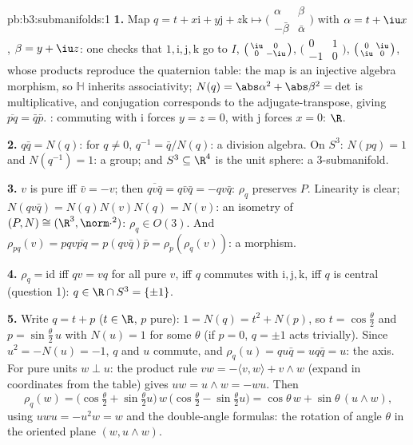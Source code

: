 \begin{solution}{pb:b3:submanifolds:1}
\textbf{1.} Map $q = t + x\mathrm i + y\mathrm j + z\mathrm k
\mapsto \bigl(\begin{smallmatrix}\alpha & \beta\\ -\bar\beta
& \bar\alpha\end{smallmatrix}\bigr)$ with $\alpha = t + \iu
x$, $\beta = y + \iu z$: one checks that $1, \mathrm i,
\mathrm j, \mathrm k$ go to $I$, $\bigl(\begin{smallmatrix}
\iu & 0\\ 0 & -\iu\end{smallmatrix}\bigr)$,
$\bigl(\begin{smallmatrix}0 & 1\\ -1 &
0\end{smallmatrix}\bigr)$, $\bigl(\begin{smallmatrix}0 &
\iu\\ \iu & 0\end{smallmatrix}\bigr)$, whose products
reproduce the quaternion table: the map is an injective
algebra morphism, so $\mathbb H$ inherits associativity;
$N(q) = \abs\alpha^2 + \abs\beta^2 = \det$ is multiplicative,
and conjugation corresponds to the adjugate-transpose,
giving $\overline{pq} = \bar q\bar p$. : commuting
with $\mathrm i$ forces $y = z = 0$, with $\mathrm j$ forces
$x = 0$: $\R$.

\textbf{2.} $q\bar q = N(q)$: for $q \neq 0$, $q^{-1} = \bar
q/N(q)$: a division algebra. On $S^3$: $N(pq) = 1$ and
$N(q^{-1}) = 1$: a group; and $S^3 \subseteq \R^4$ is the
unit sphere: a  $3$-submanifold.

\textbf{3.} $v$ is pure iff $\bar v = -v$; then
$\overline{qv\bar q} = q\bar v\bar q = -qv\bar q$: $\rho_q$
preserves $P$. Linearity is clear; $N(qv\bar q) =
N(q)N(v)N(q) = N(v)$: an isometry of $(P, N) \cong (\R^3,
\norm\cdot^2)$: $\rho_q \in O(3)$. And $\rho_{pq}(v) =
pqv\overline{pq} = p(qv\bar q)\bar p =
\rho_p(\rho_q(v))$: a morphism.

\textbf{4.} $\rho_q = \mathrm{id}$ iff $qv = vq$ for all pure
$v$, iff $q$ commutes with $\mathrm i, \mathrm j, \mathrm k$,
iff $q$ is central (question 1): $q \in \R\cap S^3 =
\{\pm1\}$.

\textbf{5.} Write $q = t + p$ ($t \in \R$, $p$ pure): $1 =
N(q) = t^2 + N(p)$, so $t = \cos\frac\theta2$ and $p =
\sin\frac\theta2\,u$ with $N(u) = 1$ for some $\theta$
(if $p = 0$, $q = \pm1$ acts trivially). Since $u^2 = -N(u)
= -1$, $q$ and $u$ commute, and $\rho_q(u) = qu\bar q =
uq\bar q = u$: the axis. For pure units $w \perp u$: the
product rule $vw = -\langle v, w\rangle + v\wedge w$
(expand in coordinates from the table) gives $uw = u\wedge w
= -wu$. Then
\[
\rho_q(w) = \bigl(\cos\tfrac\theta2 +
\sin\tfrac\theta2u\bigr)\,w\,\bigl(\cos\tfrac\theta2 -
\sin\tfrac\theta2u\bigr)
= \cos\theta\,w + \sin\theta\,(u\wedge w),
\]
using $uwu = -u^2w = w$ and the double-angle formulas: the
rotation of angle $\theta$ in the oriented plane $(w,
u\wedge w)$.


\end{solution}
